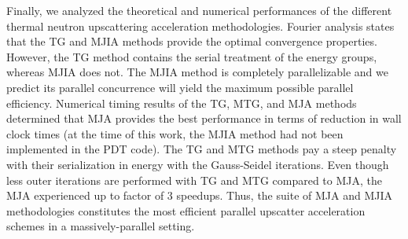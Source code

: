 Finally, we analyzed the theoretical and numerical performances of the different thermal neutron upscattering acceleration methodologies. Fourier analysis states that the TG and MJIA methods provide the optimal convergence properties. However, the TG method contains the serial treatment of the energy groups, whereas MJIA does not. The MJIA method is completely parallelizable and we predict its parallel concurrence will yield the maximum possible parallel efficiency. Numerical timing results of the TG, MTG, and MJA methods determined that MJA provides the best performance in terms of reduction in wall clock times (at the time of this work, the MJIA method had not been implemented in the PDT code). The TG and MTG methods pay a steep penalty with their serialization in energy with the Gauss-Seidel iterations. Even though less outer iterations are performed with TG and MTG compared to MJA, the MJA experienced up to factor of 3 speedups. Thus, the suite of MJA and MJIA methodologies constitutes the most efficient parallel upscatter acceleration schemes in a massively-parallel setting.




